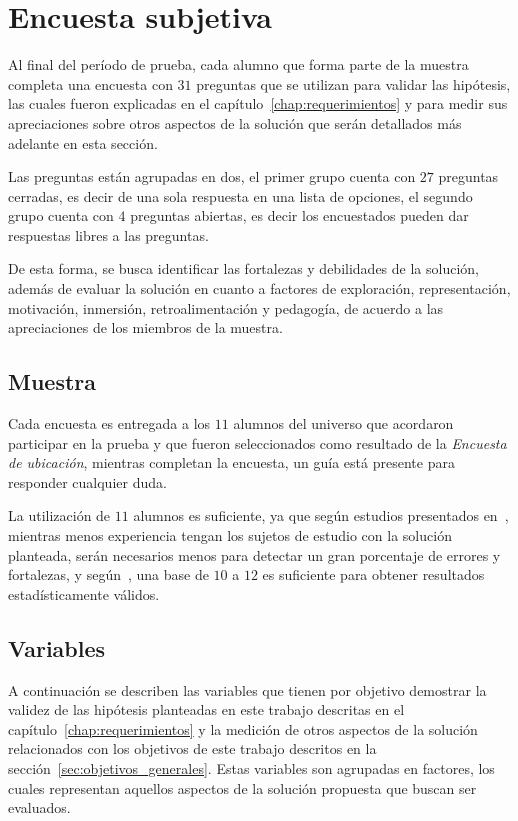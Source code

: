 \section{Encuesta subjetiva}
\label{sec:subjetiva}

Al final del período de prueba, cada alumno que forma parte de la muestra
completa una encuesta con $31$ preguntas que se utilizan para validar las
hipótesis, las cuales fueron explicadas en el capítulo~\ref{chap:requerimientos}
y para medir sus apreciaciones sobre otros aspectos de la solución que serán
detallados más adelante en esta sección. 

Las preguntas están agrupadas en dos, el primer grupo cuenta con $27$ preguntas
cerradas, es decir de una sola respuesta en una lista de opciones, el segundo
grupo cuenta con $4$ preguntas abiertas, es decir los encuestados pueden dar
respuestas libres a las preguntas. 

De esta forma, se busca identificar las fortalezas y debilidades de la solución,
además de evaluar la solución en cuanto a factores de exploración,
representación, motivación, inmersión, retroalimentación y pedagogía, de acuerdo
a las apreciaciones de los miembros de la muestra.

\subsection{Muestra}

Cada encuesta es entregada a los $11$ alumnos del universo que acordaron
participar en la prueba y que fueron seleccionados como resultado de la 
\emph{Encuesta de ubicación}, mientras completan la encuesta, un guía está presente
para responder cualquier duda.

La utilización de $11$ alumnos es suficiente, ya que según estudios presentados
en~\cite{nielsen2000}, mientras menos experiencia tengan los sujetos de estudio
con la solución planteada, serán necesarios menos para detectar un gran
porcentaje de errores y fortalezas, y según~\cite{ritch2009}, una base de $10$ a
$12$ es suficiente para obtener resultados estadísticamente válidos.

\subsection{Variables}
\label{sec:variables}

A continuación se describen las variables que tienen por objetivo demostrar la
validez de las hipótesis planteadas en este trabajo descritas en el
capítulo~\ref{chap:requerimientos} y la medición de otros aspectos de la
solución relacionados con los objetivos de este trabajo descritos en la
sección~\ref{sec:objetivos_generales}. Estas variables son agrupadas en
factores, los cuales representan aquellos aspectos de la solución propuesta que
buscan ser evaluados.

